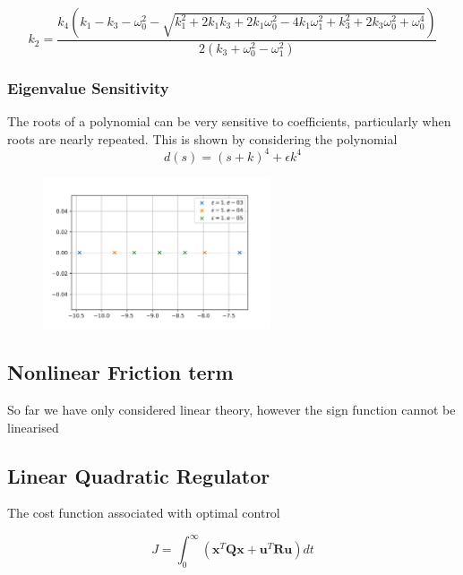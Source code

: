 \documentclass{article}
\begin{document}
\begin{equation}
  k_2 = \frac{k_{4} \left(k_{1} - k_{3} - \omega_{0}^{2} - \sqrt{k_{1}^{2} + 2 k_{1} k_{3} + 2 k_{1} \omega_{0}^{2} - 4 k_{1} \omega_{1}^{2} + k_{3}^{2} + 2 k_{3} \omega_{0}^{2} + \omega_{0}^{4}}\right)}{2 \left(k_{3} + \omega_{0}^{2} - \omega_{1}^{2}\right)}
\end{equation}

\subsubsection{Eigenvalue Sensitivity}

The roots of a polynomial can be very sensitive to coefficients, particularly when roots are nearly repeated.
This is shown by considering the polynomial
\begin{equation}
  d(s) = (s+k)^4 + \epsilon k^4
\end{equation}

\begin{figure}[H]
  \centering
  \includegraphics[width=0.6\textwidth]{figures/pole_sensitivity.png}
  \caption{}
  \label{fig:pole_sensitivity}
\end{figure}

\subsection{Nonlinear Friction term}
So far we have only considered linear theory, however the sign function cannot be linearised

\subsection{Linear Quadratic Regulator}

The cost function associated with optimal control

\begin{equation}
  J = \int_0^\infty \left( \mathbf{x}^T \mathbf{Q} \mathbf{x} + \mathbf{u}^T \mathbf{R} \mathbf{u} \right) dt
\end{equation}
\end{document}
